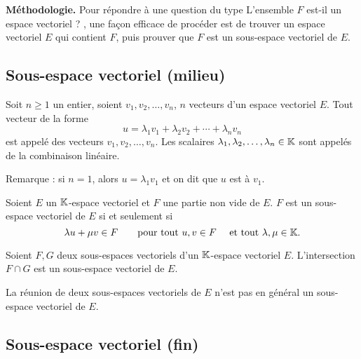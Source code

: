 \documentclass[10pt,class=article,crop=false]{standalone}
\begin{document}
\begin{multicols}{2}
\textbf{Méthodologie.}
Pour répondre à une question du type \og L'ensemble $F$ est-il un espace vectoriel ? \fg, une façon efficace de procéder est de trouver un espace vectoriel $E$ qui contient $F$, puis prouver que $F$ est un sous-espace vectoriel de $E$.


\subsection{Sous-espace vectoriel (milieu)}

Soit $n\ge1$ un entier, soient  $v_1, v_2, \ldots, v_n$, $n$  vecteurs d'un espace vectoriel $E$.
Tout vecteur de la forme
$$u=\lambda_1 v_1+\lambda_2v_2+ \cdots + \lambda_n v_n$$
est appelé  des vecteurs $v_1, v_2, \ldots, v_n$.
Les scalaires $\lambda_1, \lambda_2, \ldots , \lambda_n \in \mathbb{K}$ sont appelés  de la combinaison linéaire.


Remarque : si $n=1$, alors $u=\lambda_1 v_1$ et on dit que $u$ est  à $v_1$.



\begin{theoreme}%
	Soient $E$ un $\mathbb{K}$-espace vectoriel et $F$ une partie non vide de $E$.
	$F$ est un sous-espace vectoriel de $E$ si et seulement si
	$$\lambda u + \mu v \in F \qquad \text{pour tout } u,v \in F \quad \text{ et tout } \lambda, \mu \in \mathbb{K}.$$
\end{theoreme}



\begin{proposition}
	Soient $F,G$ deux sous-espaces vectoriels d'un $\mathbb{K}$-espace vectoriel $E$.
	L'intersection $F \cap G$ est un sous-espace vectoriel de $E$.
\end{proposition}


La réunion de deux sous-espaces vectoriels de $E$ n'est pas en général un sous-espace vectoriel de $E$.


\subsection{Sous-espace vectoriel (fin)}




\end{multicols}
\end{document}
